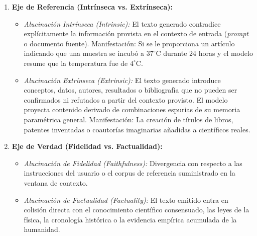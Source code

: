 \begin{enumerate}
    \item \textbf{Eje de Referencia (Intrínseca vs. Extrínseca):}
    \begin{itemize}
        \item \textit{Alucinación Intrínseca (Intrinsic):} El texto generado contradice explícitamente la información provista en el contexto de entrada (\textit{prompt} o documento fuente). Manifestación: Si se le proporciona un artículo indicando que una muestra se incubó a $37^\circ\text{C}$ durante 24 horas y el modelo resume que la temperatura fue de $4^\circ\text{C}$.
        \item \textit{Alucinación Extrínseca (Extrinsic):} El texto generado introduce conceptos, datos, autores, resultados o bibliografía que no pueden ser confirmados ni refutados a partir del contexto provisto. El modelo proyecta contenido derivado de combinaciones espurias de su memoria paramétrica general. Manifestación: La creación de títulos de libros, patentes inventadas o coautorías imaginarias añadidas a científicos reales.
    \end{itemize}
    \item \textbf{Eje de Verdad (Fidelidad vs. Factualidad):}
    \begin{itemize}
        \item \textit{Alucinación de Fidelidad (Faithfulness):} Divergencia con respecto a las instrucciones del usuario o el corpus de referencia suministrado en la ventana de contexto.
        \item \textit{Alucinación de Factualidad (Factuality):} El texto emitido entra en colisión directa con el conocimiento científico consensuado, las leyes de la física, la cronología histórica o la evidencia empírica acumulada de la humanidad.
    \end{itemize}
\end{enumerate}


